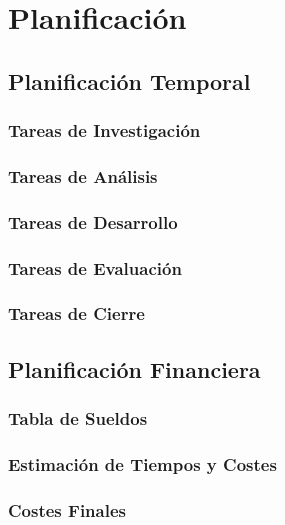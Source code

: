 \chapter{Planificación}\label{cap:planificación}

\section{Planificación Temporal}

\subsection{Tareas de Investigación}

\subsection{Tareas de Análisis}

\subsection{Tareas de Desarrollo}

\subsection{Tareas de Evaluación}

\subsection{Tareas de Cierre}

\section{Planificación Financiera}

\subsection{Tabla de Sueldos}

\subsection{Estimación de Tiempos y Costes}

\subsection{Costes Finales}